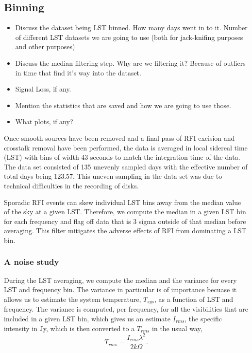 \documentclass[twocolumn,numberedappendix]{emulateapj}
\begin{document}
{\subsection{Binning}
\begin{itemize}
    \item{Discuss the dataset being LST binned. How many days went in to it.
Number of different LST datasets we are going to use (both for jack-knifing
purposes and other purposes)}
    \item{Discuss the median filtering step. Why are we filtering it? Because of
outliers in time that find it's way into the dataset.}
    \item{Signal Loss, if any.}
    \item{Mention the statistics that are saved and how we are going to use those.}
    \item{What plots, if any?}
\end{itemize}

Once smooth sources have been removed and a final pass of RFI excision and
crosstalk removal have been performed, the data is averaged in local sidereal
time (LST) with bins of width 43 seconds to match the integration time of the
data. The data set consisted of 135 unevenly sampled days with the effective
number of total days being 123.57. This uneven sampling in the data set was due
to technical difficulties in the recording of disks.

Sporadic RFI events can skew individual LST bins away from the median value of
the sky at a given LST. Therefore, we compute the median in a given LST bin for
each frequency and flag off data that is 3 sigma outside of that median before
averaging. This filter mitigates the adverse effects of RFI from dominating a
LST bin. 

\subsubsection{A noise study}
During the LST averaging, we compute the median and the variance for every LST
and frequency bin. The variance in particular is of importance becuase it allows
us to estimate the system temperature, $T_{sys}$, as a function of LST and
frequency. The variance is computed, per frequency, for all the visibilities
that are included in a given LST bin, which gives us an estimate ${I_{rms}}$,
the specific intensity in Jy, which is then converted to a $T_{rms}$ in the
usual way, 
\begin{equation}
    T_{rms} = \frac{I_{rms}\lambda^{2}}{2k\Omega}.
\end{equation}

}
\end{document}
